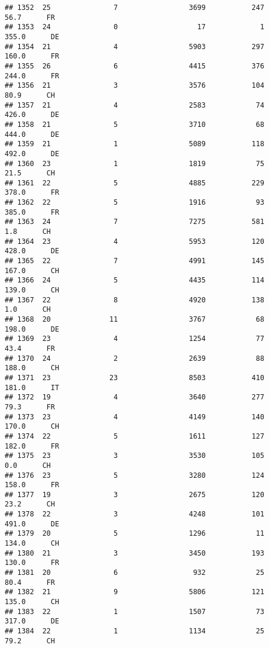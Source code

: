 \documentclass[
]{article}
\begin{document}
\begin{verbatim}
## 1352  25               7                 3699           247     56.7      FR
## 1353  24               0                   17             1    355.0      DE
## 1354  21               4                 5903           297    160.0      FR
## 1355  26               6                 4415           376    244.0      FR
## 1356  21               3                 3576           104     80.9      CH
## 1357  21               4                 2583            74    426.0      DE
## 1358  21               5                 3710            68    444.0      DE
## 1359  21               1                 5089           118    492.0      DE
## 1360  23               1                 1819            75     21.5      CH
## 1361  22               5                 4885           229    378.0      FR
## 1362  22               5                 1916            93    385.0      FR
## 1363  24               7                 7275           581      1.8      CH
## 1364  23               4                 5953           120    428.0      DE
## 1365  22               7                 4991           145    167.0      CH
## 1366  24               5                 4435           114    139.0      CH
## 1367  22               8                 4920           138      1.0      CH
## 1368  20              11                 3767            68    198.0      DE
## 1369  23               4                 1254            77     43.4      FR
## 1370  24               2                 2639            88    188.0      CH
## 1371  23              23                 8503           410    181.0      IT
## 1372  19               4                 3640           277     79.3      FR
## 1373  23               4                 4149           140    170.0      CH
## 1374  22               5                 1611           127    182.0      FR
## 1375  23               3                 3530           105      0.0      CH
## 1376  23               5                 3280           124    158.0      FR
## 1377  19               3                 2675           120     23.2      CH
## 1378  22               3                 4248           101    491.0      DE
## 1379  20               5                 1296            11    134.0      CH
## 1380  21               3                 3450           193    130.0      FR
## 1381  20               6                  932            25     80.4      FR
## 1382  21               9                 5806           121    135.0      CH
## 1383  22               1                 1507            73    317.0      DE
## 1384  22               1                 1134            25     79.2      CH

\end{verbatim}
\end{document}
